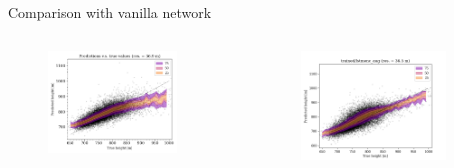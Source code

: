 \documentclass{beamer}
\begin{document}
\begin{frame}{Comparison with vanilla network}
\begin{columns}
    \begin{figure}
        \centering
            \includegraphics[width=0.85\textwidth]{figures/long_run_vanilla.png}
    \end{figure}
    \begin{figure}
        \centering
        \includegraphics[width=0.85\textwidth]{figures/augmented_train.png}
    \end{figure}

\end{columns}
\end{frame}


\end{document}
